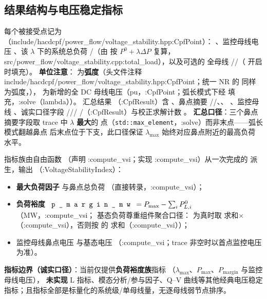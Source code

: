 \subsection{结果结构与电压稳定指标}
每个被接受点记为 （include/hacdcpf/power\_flow/voltage\_stability.hpp:CpfPoint）：
、监控母线电压 、该 $\lambda$ 下的系统总负荷
/（由  按
$P^0+\lambda\Delta P$ 复算，src/power\_flow/voltage\_stability.cpp:total\_load），以及可选的
全母线 //（ 开启时填充）。
\textbf{单位注意}： 为\textbf{弧度}（头文件注释
include/hacdcpf/power\_flow/voltage\_stability.hpp:CpfPoint；统一 NR 的 
同样为弧度，），
 为新增的全 DC 母线电压（pu，:CpfPoint；弧长模式下经
 填充，:solve（lambda））。
汇总结果 （:CpfResult）含 、鼻点摘要
//、、
、监控母线 、诚实口径字段
///%
/（:CpfResult）与校正求解计数
。
\textbf{汇总口径}：三个鼻点摘要字段取 trace 中 $\lambda$ \textbf{最大}的
点（\texttt{std::max\_element}，:solve）而非末点——弧长模式翻越鼻点
后末点位于下支，此口径保证 $\lambda_{\max}$ 始终对应鼻点附近的最高负荷
水平。

指标族由自由函数 （声明 :compute\_vsi；实现
:compute\_vsi）从一次完成的  派生，输出
（:VoltageStabilityIndex）：
\begin{itemize}
  \item \textbf{最大负荷因子}  与鼻点总负荷
        （直接转录，:compute\_vsi）；
  \item \textbf{负荷裕度}
        $\fld{p\_margin\_mw}=P_{\max}-\sum_i P_{L,i}^{0}$（MW，:compute\_vsi；
        基态负荷尊重组件聚合口径： 为真时取
         求和$\times$（:compute\_vsi），否则按
         的  求和（:compute\_vsi））；
  \item 监控母线鼻点电压  与基态电压 
        （:compute\_vsi；trace 非空时以首点监控电压为准）。
\end{itemize}
\textbf{指标边界（诚实口径）}：当前仅提供\textbf{负荷裕度族}指标
（$\lambda_{\max}$、$P_{\max}$、$P_{\mathrm{margin}}$ 与监控母线电压），
\textbf{未实现} L 指标、模态分析/参与因子、Q--V 曲线等其他经典电压稳定
指标；且指标全部是标量化的系统级/单母线量，无逐母线弱节点排序。

